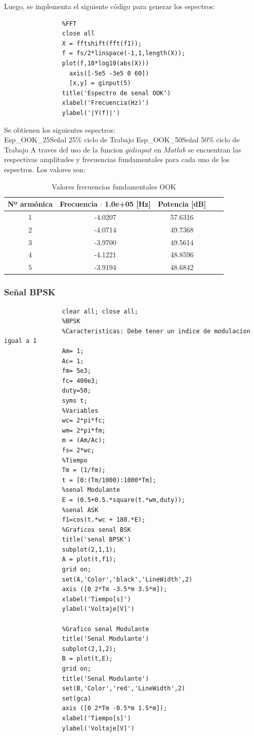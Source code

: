 \documentclass[letterpaper, titlepage]{article}
\begin{document}
			Luego, se implementa el siguiente código para generar los espectros:		

			\begin{lstlisting}[label=some-code,caption=Codigo Matlab FFT OOK]
				%%
				%FFT
				close all
				X = fftshift(fft(f1));
				f = fs/2*linspace(-1,1,length(X));
				plot(f,10*log10(abs(X)))
				  axis([-5e5 -3e5 0 60])
				  [x,y] = ginput(5)
				title('Espectro de senal OOK')
				xlabel('Frecuencia(Hz)')
				ylabel('|Y(f)|')
			\end{lstlisting}

			Se obtienen los siguientes espectros:\\
					{Esp_OOK_25}{\label{fig:sim}}{Señal 25\% ciclo de Trabajo}
					{Esp_OOK_50}{\label{fig:sim}}{Señal 50\% ciclo de Trabajo}
			\newpage
			A traves del uso de la funcion $gidinput$ en $Matlab$ se encuentran las respectivas amplitudes y frecuencias fundamentales para cada uno de los espectros. Los valores son:

			\begin{table}[ht]
				\centering
				\begin{tabular}{c c c c c}
					Nº armónica & Frecuencia $\cdot$ 1.0e+05 [Hz] & Potencia [dB]\\
					\hline
					1 & -4.0207 & 57.6316  \\
					2 & -4.0714 & 49.7368   \\
					3 & -3.9700 & 49.5614   \\
					4 & -4.1221 & 48.8596   \\
					5 & -3.9194 & 48.6842  
				\end{tabular}
				\caption{Valores frecuencias fundamentales OOK}
				\label{tab:tabla1}
			\end{table}

		\newpage
		\subsubsection{Señal BPSK}
			\begin{lstlisting}[label=some-code,caption=Codigo Matlab BPSK]
				%Experiencia 3
				clear all; close all;
				%BPSK
				%Caracteristicas: Debe tener un indice de modulacion igual a 1
				Am= 1;
				Ac= 1;
				fm= 5e3; 
				fc= 400e3;
				duty=50;
				syms t;
				%Variables
				wc= 2*pi*fc;
				wm= 2*pi*fm;
				m = (Am/Ac);
				fs= 2*wc;
				%Tiempo
				Tm = (1/fm);
				t = [0:(Tm/1000):1000*Tm];
				%senal Modulante
				E = (0.5+0.5.*square(t.*wm,duty));
				%senal ASK
				f1=cos(t.*wc + 180.*E);
				%Graficos senal BSK
				title('senal BPSK')
				subplot(2,1,1);
				A = plot(t,f1);
				grid on;
				set(A,'Color','black','LineWidth',2)
				axis ([0 2*Tm -3.5*m 3.5*m]);
				xlabel('Tiempo[s]')
				ylabel('Voltaje[V]')

				%Grafico senal Modulante
				title('Senal Modulante')
				subplot(2,1,2);
				B = plot(t,E);
				grid on;
				title('Senal Modulante')
				set(B,'Color','red','LineWidth',2)
				set(gca)
				axis ([0 2*Tm -0.5*m 1.5*m]);
				xlabel('Tiempo[s]')
				ylabel('Voltaje[V]')
			\end{lstlisting}
\end{document}
